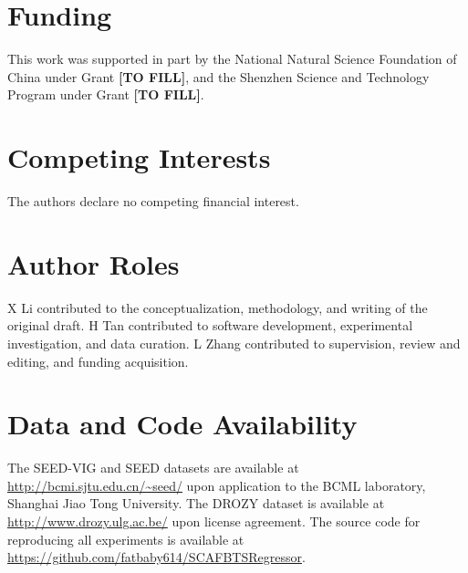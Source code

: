 \documentclass{iopjournal}
\begin{document}
\section*{Funding}
This work was supported in part by the National Natural Science Foundation of China under Grant \textbf{[TO FILL]}, and the Shenzhen Science and Technology Program under Grant \textbf{[TO FILL]}.

\section*{Competing Interests}
The authors declare no competing financial interest.

\section*{Author Roles}
X Li contributed to the conceptualization, methodology, and writing of the original draft. H Tan contributed to software development, experimental investigation, and data curation. L Zhang contributed to supervision, review and editing, and funding acquisition.

\section*{Data and Code Availability}
The SEED-VIG and SEED datasets are available at \url{http://bcmi.sjtu.edu.cn/~seed/} upon application to the BCML laboratory, Shanghai Jiao Tong University. The DROZY dataset is available at \url{http://www.drozy.ulg.ac.be/} upon license agreement. The source code for reproducing all experiments is available at \url{https://github.com/fatbaby614/SCAFBTSRegressor}.




\end{document}
